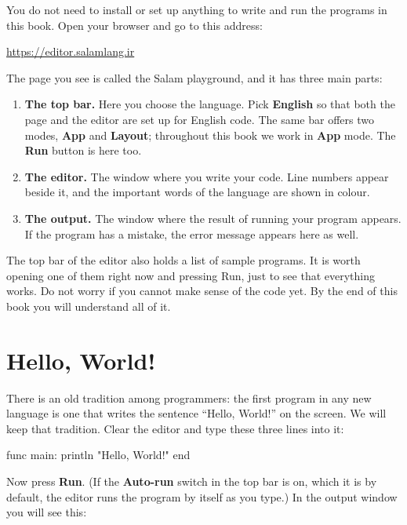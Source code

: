 You do not need to install or set up anything to write and run the programs
in this book. Open your browser and go to this address:
\begin{center}
\url{https://editor.salamlang.ir}
\end{center}
The page you see is called the Salam playground, and it has three main
parts:
\begin{enumerate}
  \item \textbf{The top bar.} Here you choose the language. Pick
        \textbf{English} so that both the page and the editor are set up
        for English code. The same bar offers two modes, \textbf{App}
        and \textbf{Layout}; throughout this book we work in
        \textbf{App} mode. The \textbf{Run} button is here too.
  \item \textbf{The editor.} The window where you write your code. Line
        numbers appear beside it, and the important words of the language
        are shown in colour.
  \item \textbf{The output.} The window where the result of running your
        program appears. If the program has a mistake, the error message
        appears here as well.
\end{enumerate}

\begin{tip}
The top bar of the editor also holds a list of sample programs. It is worth
opening one of them right now and pressing Run, just to see that everything
works. Do not worry if you cannot make sense of the code yet. By the end of
this book you will understand all of it.
\end{tip}

\section{Hello, World!}

There is an old tradition among programmers: the first program in any new
language is one that writes the sentence ``Hello, World!'' on the screen. We
will keep that tradition. Clear the editor and type these three lines into
it:

\begin{salamcode}
func main:
    println "Hello, World!"
end
\end{salamcode}

Now press \textbf{Run}. (If the \textbf{Auto-run} switch in the top bar is on,
which it is by default, the editor runs the program by itself as you type.)
In the output window you will see this:

